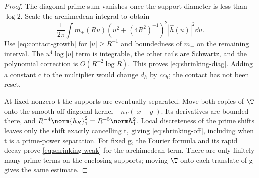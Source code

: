 \begin{proof}
The diagonal prime sum vanishes once the support diameter is
less than $\log2$. Scale the archimedean integral to obtain
\[
\frac1{2\pi}\int m_+(Ru)(u^2+(4R^2)^{-1})^2
                              |\widehat h(u)|^2\dd u.
\]
Use \eqref{eq:contact-growth} for $|u|\ge R^{-1}$ and boundedness
of $m_+$ on the remaining interval. The $u^4\log|u|$ term is
integrable, the other tails are Schwartz, and the polynomial
correction is $O(R^{-2}\log R)$. This proves
\eqref{eq:shrinking-diag}. Adding a constant c to the multiplier
would change $d_h$ by $cc_h$; the contact has not been reset.

At fixed nonzero t the supports are eventually separated.
Move both copies of $\T$ onto the smooth off-diagonal kernel
$-n_\Gamma(|x-y|)$. Its derivatives are bounded there, and
$R^{-4}\norm{h_R}_1^2=R^{-5}\norm h_1^2$.
Local discreteness of the prime shifts leaves only the shift
exactly cancelling t, giving \eqref{eq:shrinking-off}, including
when t is a prime-power separation. For fixed g, the Fourier
formula and its rapid decay prove \eqref{eq:shrinking-weak}
for the archimedean term. There are only finitely many prime
terms on the enclosing supports; moving $\T$ onto each
translate of g gives the same estimate.
\end{proof}

